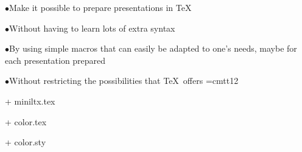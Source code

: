 %
%
%
%


\NewSlide
{}%
\normalfont
\def\LinkBar{} 	%
%
\SlideFoot 	%
\item{$\bullet$}\textcolor{text}{Make it possible to prepare presentations in \TeX}
\vskip3mm
\item{$\bullet$}\textcolor{text}{Without having to learn lots of extra syntax}
\vskip3mm
\item{$\bullet$}\textcolor{text}{By using simple macros that can easily be adapted to one's needs, maybe for each presentation prepared}
\vskip3mm
\item{$\bullet$}\textcolor{text}{Without restricting the possibilities that \TeX\ offers}
\NewSlide
{}
\font\cdfo=cmtt12
\def\cf{\color{code}\cdfo}
\item{+} {\cf miniltx.tex}
\item{+} {\cf color.tex}
\item{+} {\cf color.sty}


